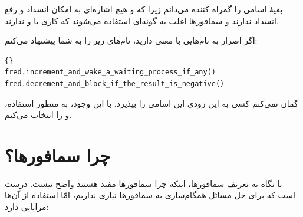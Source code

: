 \documentclass{book}
\begin{document}
    بقیه‌ٔ اسامی را گمراه کننده می‌دانم زیرا که   و  
    هیچ اشاره‌ای به امکان انسداد و رفع انسداد ندارند و سمافورها اغلب به گونه‌ای استفاده می‌شوند که کاری با 
     و 
    ندارند. 
    
    اگر اصرار به نام‌هایی با معنی دارید، نام‌های زیر را به شما پیشنهاد می‌کنم:
    

\begin{latin}
\begin{latin}
\begin{lstlisting}[title=\rl{اعمال سمافور}]{}
fred.increment_and_wake_a_waiting_process_if_any()
fred.decrement_and_block_if_the_result_is_negative()	
\end{lstlisting}
\end{latin}
\end{latin}

    گمان نمی‌کنم کسی به این زود‌ی این اسامی را بپذیرد. با این وجود، به منظور استفاده، 
     و  را انتخاب می‌کنم.
    


\section{چرا سمافورها؟}

    با نگاه به تعریف سمافورها، اینکه چرا سمافورها مفید هستند واضح نیست. 
    درست است که برای حل مسائل همگام‌سازی به سمافورها نیازی نداریم، امّا استفاده از آن‌ها مزایایی دارد:
\end{document}
